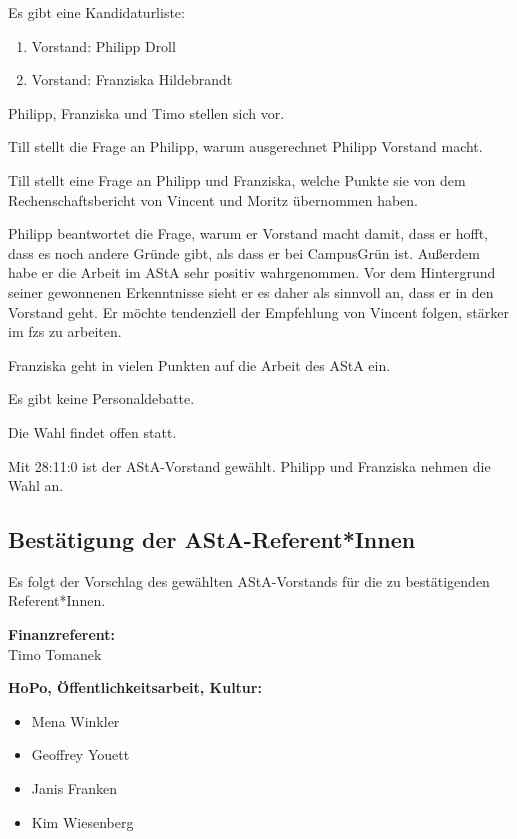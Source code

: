 \documentclass[ngerman,headheight=70pt]{scrartcl}
\begin{document}
    Es gibt eine Kandidaturliste:

    \begin{enumerate}
        \item Vorstand: Philipp Droll
        \item Vorstand: Franziska Hildebrandt
    \end{enumerate}

    Philipp, Franziska und Timo stellen sich vor.

    Till stellt die Frage an Philipp, warum ausgerechnet
    Philipp Vorstand macht.

    Till stellt eine Frage an Philipp und Franziska, welche Punkte sie
    von dem Rechenschaftsbericht von Vincent und Moritz übernommen haben.

    Philipp beantwortet die Frage, warum er Vorstand macht damit, dass
    er hofft, dass es noch andere Gründe gibt, als dass er bei CampusGrün ist.
    Außerdem habe er die Arbeit im AStA sehr positiv wahrgenommen. Vor dem
    Hintergrund seiner gewonnenen Erkenntnisse sieht er es daher als sinnvoll an,
    dass er in den Vorstand geht. Er möchte tendenziell der Empfehlung von Vincent
    folgen, stärker im fzs zu arbeiten.

    Franziska geht in vielen Punkten auf die Arbeit des AStA ein.

    Es gibt keine Personaldebatte.

    Die Wahl findet offen statt.

    Mit 28:11:0 ist der AStA-Vorstand gewählt. Philipp und Franziska nehmen
    die Wahl an.

    \subsection{Bestätigung der AStA-Referent*Innen}

    Es folgt der Vorschlag des gewählten AStA-Vorstands für die zu bestätigenden
    Referent*Innen.

    \textbf{Finanzreferent:}\\
    Timo Tomanek

    \textbf{HoPo, Öffentlichkeitsarbeit, Kultur:}
    \begin{itemize}
        \item Mena Winkler
        \item Geoffrey Youett
        \item Janis Franken
        \item Kim Wiesenberg
    \end{itemize}
\end{document}
